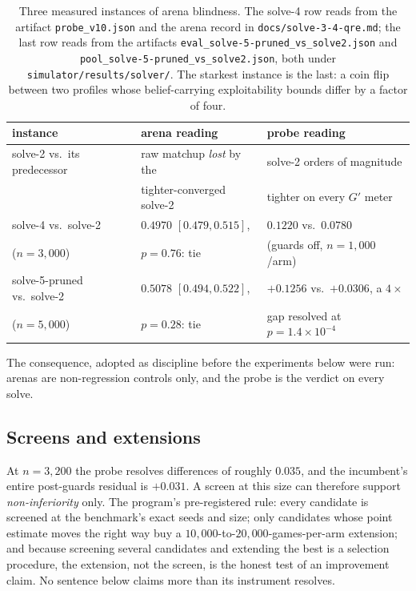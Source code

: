 \documentclass[11pt]{article}
\theoremstyle{plain}
\theoremstyle{definition}
\theoremstyle{remark}
\newcommand{\code}[1]{\texttt{\small #1}}
\newcommand{\gp}{\ensuremath{G'}}
\begin{document}
\begin{table}[ht]
\centering\footnotesize
\begin{tabular}{@{}lll@{}}
\toprule
instance & arena reading & probe reading \\
\midrule
solve-2 vs.\ its predecessor \cite{rb2} &
  raw matchup \emph{lost} by the & solve-2 orders of magnitude \\
  & tighter-converged solve-2 & tighter on every $\gp$ meter \\
\addlinespace
solve-4 vs.\ solve-2 &
  $0.4970$ $[0.479,0.515]$, & $0.1220$ vs.\ $0.0780$ \\
  \quad($n=3{,}000$) & $p=0.76$: tie &
  \quad(guards off, $n=1{,}000$/arm) \\
\addlinespace
solve-5-pruned vs.\ solve-2 &
  $0.5078$ $[0.494,0.522]$, & $+0.1256$ vs.\ $+0.0306$, a $4\times$ \\
  \quad($n=5{,}000$) & $p=0.28$: tie &
  \quad gap resolved at $p=1.4\times10^{-4}$ \\
\bottomrule
\end{tabular}
\caption{Three measured instances of arena blindness. The solve-4 row
reads from the artifact \code{probe\_v10.json} and the arena record in
\code{docs/solve-3-4-qre.md}; the last row reads from the artifacts
\code{eval\_solve-5-pruned\_vs\_solve2.json} and
\code{pool\_solve-5-pruned\_vs\_solve2.json}, both under
\code{simulator/results/solver/}. The starkest instance is the last: a
coin flip between two profiles whose belief-carrying exploitability
bounds differ by a factor of four.}
\label{tab:arena}
\end{table}

The consequence, adopted as discipline before the experiments below were
run: arenas are non-regression controls only, and the probe is the
verdict on every solve.

\subsection{Screens and extensions}\label{sec:screens}

At $n=3{,}200$ the probe resolves differences of roughly $0.035$, and
the incumbent's entire post-guards residual is $+0.031$. A screen at
this size can therefore support \emph{non-inferiority} only. The
program's pre-registered rule: every candidate is screened at the
benchmark's exact seeds and size; only candidates whose point estimate
moves the right way buy a $10{,}000$-to-$20{,}000$-games-per-arm
extension; and because screening several candidates and extending the
best is a selection procedure, the extension, not the screen, is the
honest test of an improvement claim. No sentence below claims more than
its instrument resolves.
\end{document}
